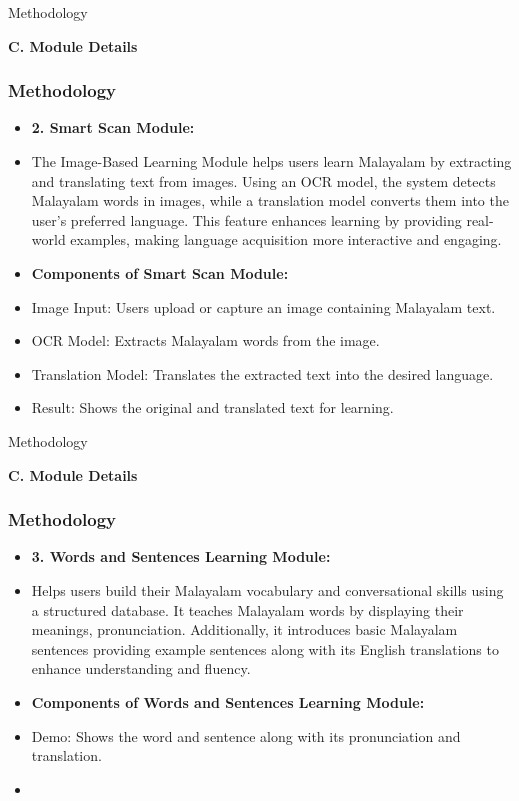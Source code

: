 \documentclass[aspectratio=169]{beamer}
\begin{document}
\begin{frame}{Methodology}
\item \textbf{C. Module Details}
    \frametitle{Methodology}
    \begin{itemize}
        \item \textbf{2. Smart Scan Module:}
        \item The Image-Based Learning Module helps users learn Malayalam by extracting and translating text from images. Using an OCR model, the system detects Malayalam words in images, while a translation model converts them into the user's preferred language. This feature enhances learning by providing real-world examples, making language acquisition more interactive and engaging.
        \item \textbf{Components of Smart Scan Module:}
        \item Image Input: Users upload or capture an image containing Malayalam text.
        \item OCR Model: Extracts Malayalam words from the image.
        \item Translation Model: Translates the extracted text into the desired language.
        \item Result: Shows the original and translated text for learning.
    \end{itemize}
\end{frame}

\begin{frame}{Methodology}
\item \textbf{C. Module Details}
    \frametitle{Methodology}
    \begin{itemize}
        \item \textbf{3. Words and Sentences Learning Module:}
        \item Helps users build their Malayalam vocabulary and conversational skills using a structured database. It teaches Malayalam words by displaying their meanings, pronunciation. Additionally, it introduces basic Malayalam sentences providing example sentences along with its English translations to enhance understanding and fluency.
        \item \textbf{Components of Words and Sentences Learning Module:}
        \item Demo: Shows the word and sentence along with its pronunciation and translation.
        \item 
    \end{itemize}
\end{frame}
\end{document}
